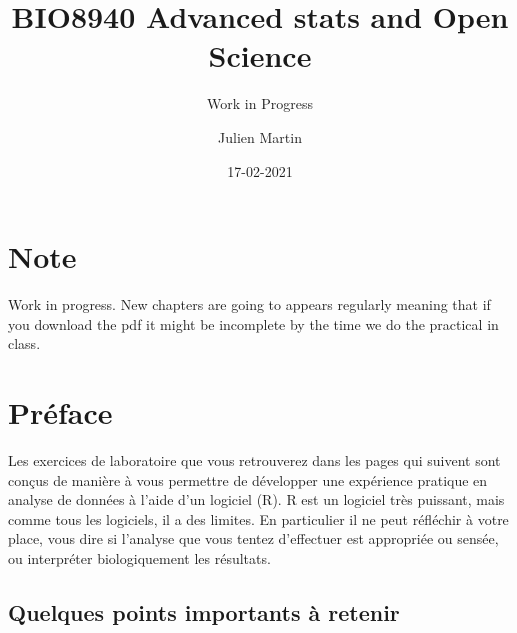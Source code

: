 \documentclass[
  12pt,
]{book}
\title{BIO8940 Advanced stats and Open Science}
\subtitle{Work in Progress}
\author{Julien Martin}
\date{17-02-2021}
\makeatletter
\newenvironment{kframe}{%
\medskip{}
\setlength{\fboxsep}{.8em}
\def\at@end@of@kframe{}%
\ifinner\ifhmode%
 \def\at@end@of@kframe{\end{minipage}}%
 \begin{minipage}{\columnwidth}%
\fi\fi%
\def\FrameCommand##1{\hskip\@totalleftmargin \hskip-\fboxsep
\colorbox{incolor}{##1}\hskip-\fboxsep
    \hskip-\linewidth \hskip-\@totalleftmargin \hskip\columnwidth}%
\MakeFramed {\advance\hsize-\width
  \@totalleftmargin\z@ \linewidth\hsize
  \@setminipage}}%
{\par\unskip\endMakeFramed%
\at@end@of@kframe}
\newenvironment{rmdblock}[1]
 {
 \begin{itemize}
 \renewcommand{\labelitemi}{
   \raisebox{-.7\height}[0pt][0pt]{
     {\setkeys{Gin}{width=3em,keepaspectratio}\texttt{[image: images/icons/\#1]}}
   }
 }
 \begin{kframe}
 \setlength{\fboxsep}{1em}
 \item
 }
 {
 \end{kframe}
 \end{itemize}
 }
\newenvironment{rmdimportant}
  {\begin{rmdblock}{important}}
  {\end{rmdblock}}
\makeatother
\begin{document}
\maketitle



{
\setcounter{tocdepth}{1}
\tableofcontents
}
\hypertarget{note}{%
\chapter*{Note}\label{note}}

\begin{rmdimportant}
Work in progress. New chapters are going to appears regularly meaning that if you download the pdf it might be incomplete by the time we do the practical in class.
\end{rmdimportant}

\hypertarget{pruxe9face}{%
\chapter*{Préface}\label{pruxe9face}}

Les exercices de laboratoire que vous retrouverez dans les pages qui suivent sont conçus de manière à vous permettre de développer une expérience pratique en analyse de données à l'aide d'un logiciel (R).
R est un logiciel très puissant, mais comme tous les logiciels, il a des limites.
En particulier il ne peut réfléchir à votre place, vous dire si l'analyse que vous tentez d'effectuer est appropriée ou sensée, ou interpréter biologiquement les résultats.

\hypertarget{quelques-points-importants-uxe0-retenir}{%
\section*{Quelques points importants à retenir}\label{quelques-points-importants-uxe0-retenir}}
\end{document}
